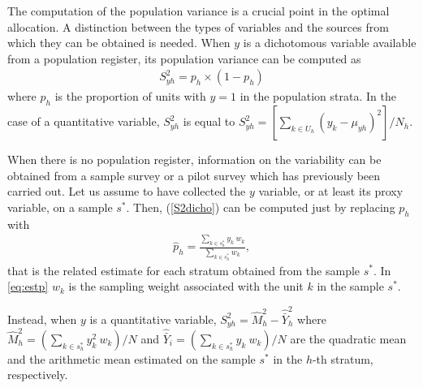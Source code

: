 The computation of the population variance is a crucial point in the optimal allocation.
A distinction between the types of variables and the sources from which they can be obtained is needed.
When $y$ is a dichotomous variable available from a population register, its population variance can be computed as
\begin{eqnarray}
	\label{S2dicho}
	S_{yh}^2 = p_h \times (1 - p_h)
\end{eqnarray}
where $p_h$ is the proportion of units with $y=1$ in the population strata. 
In the case of a quantitative variable, $S_{yh}^2$ is equal to 
$
\label{S2quant_register}
S_{yh}^2  = \left[ {\sum_{k \in U_h} \left( y_k - \mu_{yh} \right)^2} \right] / {N_h}.
$

When there is no population register, information on the variability can be obtained from a sample survey or a pilot survey which has previously been carried out. 
Let us assume to have collected the $y$ variable, or at least its proxy variable, on a sample $s^*$. 
Then, (\ref{S2dicho}) can be computed just by replacing $p_h$ with 
\begin{eqnarray}
	\label{eq:estp}
	\hat{p}_h = \frac{\sum_{k \in s_h^*} y_k \ w_k}{\sum_{k \in s_h^*} w_k},     
\end{eqnarray}
that is the related estimate for each stratum obtained from the sample $s^*$.
In \eqref{eq:estp} $w_k$ is the sampling weight associated with the unit $k$ in the sample $s^*$. 

Instead, when $y$ is a quantitative variable,
$\label{S2quant_survey} 
S_{yh}^2  =  \hat{M}_h^2 - \hat{\bar{Y}}_h^{2}$
where 
$\hat{M}_h^2 = \left( {\sum_{k \in s_h^*} y_{k}^2 \ w_k} \right) / {N}$ and $\hat{\bar{Y}}_i = \left( {\sum_{k \in s_h^*} y_{k} \ w_k} \right) / {N}$
are the quadratic mean and the arithmetic mean estimated on the sample $s^*$ in the $h$-th stratum, respectively. 



